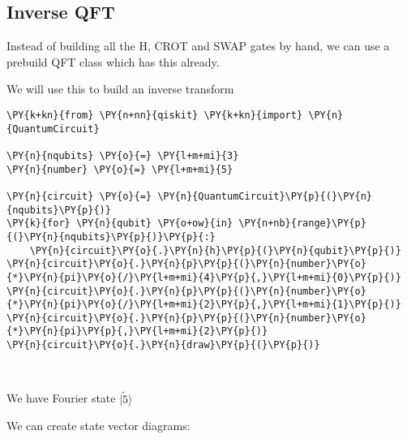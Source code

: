     \hypertarget{inverse-qft}{%
\subsection{Inverse QFT}\label{inverse-qft}}

Instead of building all the H, CROT and SWAP gates by hand, we can use a
prebuild QFT class which has this already.

We will use this to build an inverse transform

    \begin{tcolorbox}[breakable, size=fbox, boxrule=1pt, pad at break*=1mm,colback=cellbackground, colframe=cellborder]
\begin{Verbatim}[commandchars=\\\{\}]
\PY{k+kn}{from} \PY{n+nn}{qiskit} \PY{k+kn}{import} \PY{n}{QuantumCircuit}

\PY{n}{nqubits} \PY{o}{=} \PY{l+m+mi}{3}
\PY{n}{number} \PY{o}{=} \PY{l+m+mi}{5}

\PY{n}{circuit} \PY{o}{=} \PY{n}{QuantumCircuit}\PY{p}{(}\PY{n}{nqubits}\PY{p}{)}
\PY{k}{for} \PY{n}{qubit} \PY{o+ow}{in} \PY{n+nb}{range}\PY{p}{(}\PY{n}{nqubits}\PY{p}{)}\PY{p}{:}
    \PY{n}{circuit}\PY{o}{.}\PY{n}{h}\PY{p}{(}\PY{n}{qubit}\PY{p}{)}
\PY{n}{circuit}\PY{o}{.}\PY{n}{p}\PY{p}{(}\PY{n}{number}\PY{o}{*}\PY{n}{pi}\PY{o}{/}\PY{l+m+mi}{4}\PY{p}{,}\PY{l+m+mi}{0}\PY{p}{)}
\PY{n}{circuit}\PY{o}{.}\PY{n}{p}\PY{p}{(}\PY{n}{number}\PY{o}{*}\PY{n}{pi}\PY{o}{/}\PY{l+m+mi}{2}\PY{p}{,}\PY{l+m+mi}{1}\PY{p}{)}
\PY{n}{circuit}\PY{o}{.}\PY{n}{p}\PY{p}{(}\PY{n}{number}\PY{o}{*}\PY{n}{pi}\PY{p}{,}\PY{l+m+mi}{2}\PY{p}{)}
\PY{n}{circuit}\PY{o}{.}\PY{n}{draw}\PY{p}{(}\PY{p}{)}
\end{Verbatim}
\end{tcolorbox}
 
            
    
    \begin{center}
    \end{center}
    { \hspace*{\fill} \\}
    

    We have Fourier state $|\tilde{5} \rangle$

We can create state vector diagrams:

